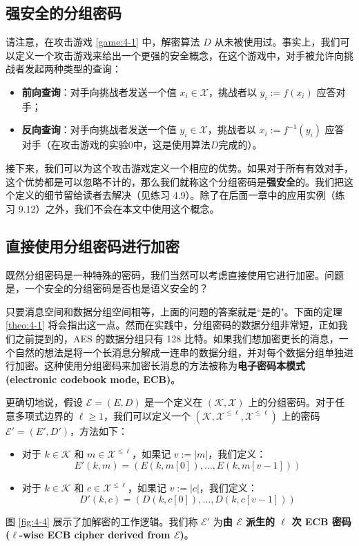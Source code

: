 \subsection{强安全的分组密码}

请注意，在攻击游戏 \ref{game:4-1} 中，解密算法 $D$ 从未被使用过。事实上，我们可以定义一个攻击游戏来给出一个更强的安全概念，在这个游戏中，对手被允许向挑战者发起两种类型的查询：
\begin{itemize}
	\item \textbf{前向查询}：对手向挑战者发送一个值 $x_i\in\mathcal{X}$，挑战者以 $y_i:=f(x_i)$ 应答对手；
	\item \textbf{反向查询}：对手向挑战者发送一个值 $y_i\in\mathcal{X}$，挑战者以 $x_i:=f^{-1}(y_i)$ 应答对手（在攻击游戏的实验$0$中，这是使用算法$D$完成的）。
\end{itemize}
接下来，我们可以为这个攻击游戏定义一个相应的优势。如果对于所有有效对手，这个优势都是可以忽略不计的，那么我们就称这个分组密码是\textbf{强安全}的。我们把这个定义的细节留给读者去解决（见练习 4.9）。除了在后面一章中的应用实例（练习 9.12）之外，我们不会在本文中使用这个概念。

\subsection{直接使用分组密码进行加密}

既然分组密码是一种特殊的密码，我们当然可以考虑直接使用它进行加密。问题是，一个安全的分组密码是否也是语义安全的？

只要消息空间和数据分组空间相等，上面的问题的答案就是``是的"。下面的定理 \ref{theo:4-1} 将会指出这一点。然而在实践中，分组密码的数据分组非常短，正如我们之前提到的，AES 的数据分组只有 128 比特。如果我们想加密更长的消息，一个自然的想法是将一个长消息分解成一连串的数据分组，并对每个数据分组单独进行加密。这种使用分组密码来加密长消息的方法被称为\textbf{电子密码本模式 (electronic codebook mode, ECB)}。

更确切地说，假设 $\mathcal{E}=(E,D)$ 是一个定义在 $(\mathcal{K},\mathcal{X})$ 上的分组密码。对于任意多项式边界的 $\ell\geq1$，我们可以定义一个 $(\mathcal{K},\mathcal{X}^{\leq\ell},\mathcal{X}^{\leq\ell})$ 上的密码 $\mathcal{E}'=(E',D')$，方法如下：
\begin{itemize}
	\item 对于 $k\in\mathcal{K}$ 和 $m\in\mathcal{X}^{\leq\ell}$，如果记 $v:=|m|$，我们定义：
	\[
    E'(k,m)=(E(k,m[0]),\dots,E(k,m[v-1]))
    \]
	\item 对于 $k\in\mathcal{K}$ 和 $c\in\mathcal{X}^{\leq\ell}$，如果记 $v:=|c|$，我们定义：
	\[
	D'(k,c)=(D(k,c[0]),\dots,D(k,c[v-1]))
	\]
\end{itemize}
图 \ref{fig:4-4} 展示了加解密的工作逻辑。我们称 $\mathcal{E}'$ 为\textbf{由 $\mathcal{E}$ 派生的 $\ell$ 次 ECB 密码 ($\ell$-wise ECB cipher derived from $\mathcal{E}$)}。

